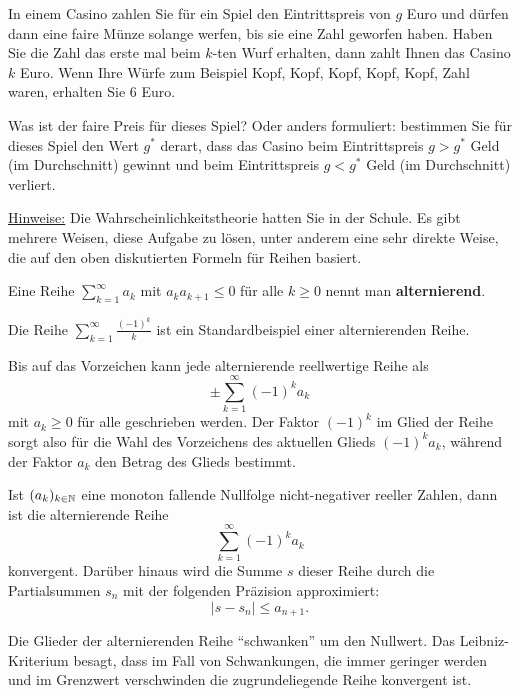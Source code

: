 \begin{aufg} 
	In einem Casino zahlen Sie für ein Spiel den Eintrittspreis von $g$ Euro und dürfen dann eine faire Münze solange werfen, bis sie eine Zahl geworfen haben. Haben Sie die Zahl das erste mal beim  $k$-ten Wurf erhalten, dann zahlt Ihnen das Casino $k$ Euro. Wenn Ihre Würfe zum Beispiel  Kopf, Kopf, Kopf, Kopf, Kopf, Zahl  waren, erhalten Sie $6$ Euro. 
	
	Was ist der faire Preis für dieses Spiel? Oder anders formuliert: bestimmen Sie für dieses Spiel den Wert $g^\ast$ derart, dass das Casino beim Eintrittspreis $g>g^\ast$ Geld (im Durchschnitt) gewinnt und beim Eintrittspreis $g<g^\ast$ Geld (im Durchschnitt) verliert. 
	
	\underline{Hinweise:} Die Wahrscheinlichkeitstheorie hatten Sie in der Schule. Es gibt mehrere Weisen, diese Aufgabe zu lösen, unter anderem eine sehr direkte Weise, die auf den oben diskutierten Formeln für Reihen basiert. 
\end{aufg} 

\begin{defn}
	Eine Reihe $\sum_{k=1}^\infty a_k$ mit $a_k a_{k+1} \le 0$ für alle $k \ge 0$ nennt man \textbf{alternierend}. 
\end{defn} 


\begin{bsp}
	Die Reihe $\sum_{k=1}^\infty \frac{(-1)^k}{k}$ ist ein Standardbeispiel einer alternierenden Reihe. 
\end{bsp} 

\begin{bem}
	Bis auf das Vorzeichen kann jede alternierende reellwertige Reihe als 
	\[
		\pm \sum_{k=1}^\infty (-1)^k a_k
	\] mit $a_k \ge 0$ für alle geschrieben werden. Der Faktor $(-1)^k$ im Glied der Reihe sorgt also für die Wahl des Vorzeichens des aktuellen Glieds $(-1)^k a_k$, während der Faktor $a_k$ den Betrag des Glieds bestimmt. 
\end{bem} 

\begin{thm} 
	Ist $(a_k)_{k \in \mathbb{N}}$ eine monoton fallende Nullfolge nicht-negativer reeller Zahlen, dann ist die alternierende Reihe 
	\[
		\sum_{k=1}^\infty (-1)^k a_k
	\]
	konvergent. Darüber hinaus wird die Summe $s$ dieser Reihe durch die Partialsummen $s_n$ mit der folgenden Präzision approximiert: 
	\[
		|s - s_n | \le a_{n+1}. 
	\]
\end{thm} 

\begin{bem} 
	Die Glieder der alternierenden Reihe ``schwanken'' um den Nullwert. Das Leibniz-Kriterium besagt, dass im Fall von Schwankungen, die immer geringer werden und im Grenzwert verschwinden die zugrundeliegende Reihe konvergent ist. 
\end{bem} 


